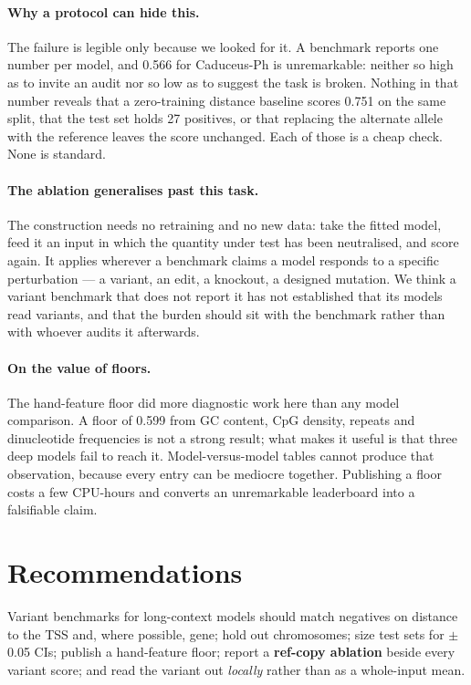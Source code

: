 \paragraph{Why a protocol can hide this.} The failure is legible only because we
looked for it. A benchmark reports one number per model, and 0.566 for
Caduceus-Ph is unremarkable: neither so high as to invite an audit nor so low as
to suggest the task is broken. Nothing in that number reveals that a
zero-training distance baseline scores 0.751 on the same split, that the test set
holds 27 positives, or that replacing the alternate allele with the reference
leaves the score unchanged. Each of those is a cheap check. None is standard.

\paragraph{The ablation generalises past this task.} The  construction
needs no retraining and no new data: take the fitted model, feed it an input in
which the quantity under test has been neutralised, and score again. It applies
wherever a benchmark claims a model responds to a specific perturbation --- a
variant, an edit, a knockout, a designed mutation. We think a variant benchmark
that does not report it has not established that its models read variants, and
that the burden should sit with the benchmark rather than with whoever audits it
afterwards.

\paragraph{On the value of floors.} The hand-feature floor did more diagnostic
work here than any model comparison. A floor of 0.599 from GC content, CpG
density, repeats and dinucleotide frequencies is not a strong result; what makes
it useful is that three deep models fail to reach it. Model-versus-model tables
cannot produce that observation, because every entry can be mediocre together.
Publishing a floor costs a few CPU-hours and converts an unremarkable
leaderboard into a falsifiable claim.
\fi

\section{Recommendations}
\label{sec:rec}

Variant benchmarks for long-context models should match negatives on distance to
the TSS and, where possible, gene; hold out chromosomes; size test sets for
$\pm$0.05 CIs; publish a hand-feature floor; report a \textbf{ref-copy ablation}
beside every variant score; and read the variant out \emph{locally} rather than
as a whole-input mean.

